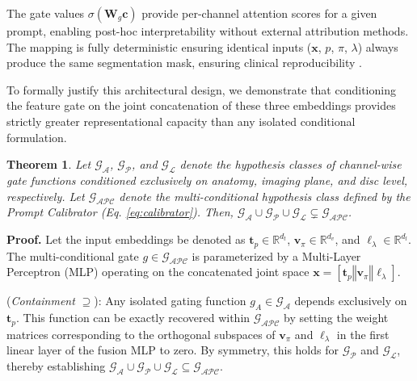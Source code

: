 \documentclass[journal]{IEEEtran}
\newtheorem{theorem}{Theorem}[section]
\begin{document}
The gate values $\sigma(\mathbf{W}_g \mathbf{c})$ provide per-channel attention scores for a given prompt, enabling post-hoc interpretability without external attribution methods.
The mapping is fully deterministic ensuring identical inputs ($\mathbf{x}$, $p$, $\pi$, $\lambda$) always produce the same segmentation mask, ensuring clinical reproducibility \cite{rsna2024templates}.

To formally justify this architectural design, we demonstrate that conditioning the feature gate on the joint concatenation of these three embeddings provides strictly greater representational capacity than any isolated conditional formulation.

\begin{theorem}
\label{thm:expressiveness}
Let $\mathcal{G}_{\mathcal{A}}$, $\mathcal{G}_{\mathcal{P}}$, and $\mathcal{G}_{\mathcal{L}}$ denote the hypothesis classes of channel-wise gate functions conditioned exclusively on anatomy, imaging plane, and disc level, respectively. Let $\mathcal{G}_{\mathcal{APC}}$ denote the multi-conditional hypothesis class defined by the Prompt Calibrator (Eq. \ref{eq:calibrator}). Then, $\mathcal{G}_{\mathcal{A}} \cup \mathcal{G}_{\mathcal{P}} \cup \mathcal{G}_{\mathcal{L}} \subsetneq \mathcal{G}_{\mathcal{APC}}$.
\end{theorem}

\textbf{Proof.}
Let the input embeddings be denoted as $\mathbf{t}_p \in \mathbb{R}^{d_t}$, $\mathbf{v}_\pi \in \mathbb{R}^{d_v}$, and $\boldsymbol\ell_\lambda \in \mathbb{R}^{d_l}$. The multi-conditional gate $g \in \mathcal{G}_{\mathcal{APC}}$ is parameterized by a Multi-Layer Perceptron (MLP) operating on the concatenated joint space $\mathbf{x} = [\mathbf{t}_p \mathbin\Vert \mathbf{v}_\pi \mathbin\Vert \boldsymbol\ell_\lambda]$.

(\textit{Containment} $\supseteq$): Any isolated gating function $g_A \in \mathcal{G}_{\mathcal{A}}$ depends exclusively on $\mathbf{t}_p$. This function can be exactly recovered within $\mathcal{G}_{\mathcal{APC}}$ by setting the weight matrices corresponding to the orthogonal subspaces of $\mathbf{v}_\pi$ and $\boldsymbol\ell_\lambda$ in the first linear layer of the fusion MLP to zero. By symmetry, this holds for $\mathcal{G}_{\mathcal{P}}$ and $\mathcal{G}_{\mathcal{L}}$, thereby establishing $\mathcal{G}_{\mathcal{A}} \cup \mathcal{G}_{\mathcal{P}} \cup \mathcal{G}_{\mathcal{L}} \subseteq \mathcal{G}_{\mathcal{APC}}$.
\end{document}
